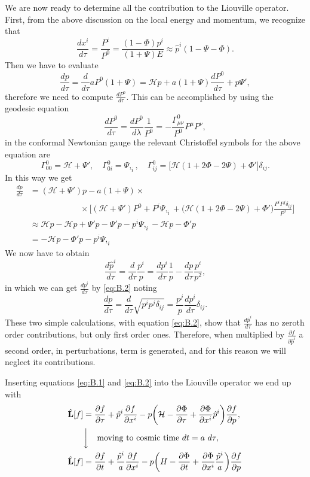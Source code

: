 We are now ready to determine all the contribution to the Liouville operator. First, from the above discussion on the local energy and momentum, we recognize that 
\begin{equation}\label{eq:B.1}
    \frac{dx^i}{d\tau}=\frac{P^i}{P^0}=\frac{(1-\Phi)p^i}{(1+\Psi)E}\approx \hat p^i(1-\Psi-\Phi).
\end{equation}
Then we have to evaluate $$\frac{dp}{d\tau}=\frac{d}{d\tau}aP^0(1+\Psi)=\mathcal{H}p+a(1+\Psi)\frac{dP^0}{d\tau}+p\Psi',$$
therefore we need to compute $\frac{dP^0}{d\tau}$. This can be accomplished by using the geodesic equation $$ \frac{dP^0}{d\tau}=\frac{dP^0}{d\lambda}\frac{1}{P^0}=-\frac{\Gamma^0_{\mu\nu}}{P^0}P^\mu P^\nu,$$
in the conformal Newtonian gauge the relevant Christoffel symbols for the above equation are $$\Gamma^0_{00}=\mathcal{H}+\Psi',\quad\Gamma^0_{0i}=\Psi,_i,\quad\Gamma^0_{ij}=\bigg[\mathcal{H}(1+2\Phi-2\Psi)+\Phi' \bigg]\delta_{ij}.$$
In this way we get
\begin{align}\label{eq:B.2}
    \frac{dp}{d\tau}&=(\mathcal{H}+\Psi') p-a(1+\Psi)\times\nonumber\\&\qquad\qquad\qquad\times \bigg[(\mathcal{H} +\Psi')P^0+P^i\Psi,_i+\big(\mathcal{H}(1+2\Phi-2\Psi)+\Phi' \big)\frac{P^iP^j\delta_{ij}}{P^0} \bigg]\nonumber\\
    &\approx\mathcal{H} p-\mathcal{H} p+\Psi'p-\Psi'p-p^i\Psi,_i-\mathcal{H}p-\Phi'p\nonumber\\
    &=-\mathcal{H} p-\Phi' p-p^i\Psi,_i
\end{align}
We now have to obtain
$$\frac{d\hat p^i}{d\tau}=\frac{d}{d\tau}\frac{p^i}{p}=\frac{dp^i}{d\tau}\frac{1}{p}-\frac{dp}{d\tau}\frac{p^i}{p^2},$$
in which we can get $\frac{dp^i}{d\tau}$ by \eqref{eq:B.2} noting
$$\frac{dp}{d\tau}=\frac{d}{d\tau}\sqrt{p^ip^j\delta_{ij}}=\frac{p^j}{p}\frac{dp^i}{d\tau}\delta_{ij}.$$
These two simple calculations, with equation \eqref{eq:B.2}, show that $\frac{d\hat p^i}{d\tau}$ has no zeroth order contributions, but only first order ones. Therefore, when multiplied by $\frac{\partial f}{\partial \hat p^i}$ a second order, in perturbations, term is generated, and for this reason we will neglect its contributions.

Inserting equations \eqref{eq:B.1} and \eqref{eq:B.2} into the Liouville operator we end up with
\begin{align}\label{eq:Liouville_scalar_perturbed}
    \hat{\mathbf{L}}[f]&=\frac{\partial f}{\partial \tau}+\hat p^i\frac{\partial f}{\partial x^i}-p\bigg(\mathcal{H}-\frac{\partial \Phi}{\partial \tau}+\frac{\partial \Phi}{\partial x^i}\hat p^i\bigg)\frac{\partial f}{\partial p},\nonumber\\
    &\bigg\downarrow\quad\text{moving to cosmic time } dt=a\ d\tau,\nonumber\\
    \hat{\mathbf{L}}[f]&=\frac{\partial f}{\partial t}+\frac{\hat p^i}{a}\frac{\partial f}{\partial x^i}-p\bigg(H-\frac{\partial \Phi}{\partial t}+\frac{\partial \Phi}{\partial x^i}\frac{\hat p^i}{a}\bigg)\frac{\partial f}{\partial p}
\end{align}
